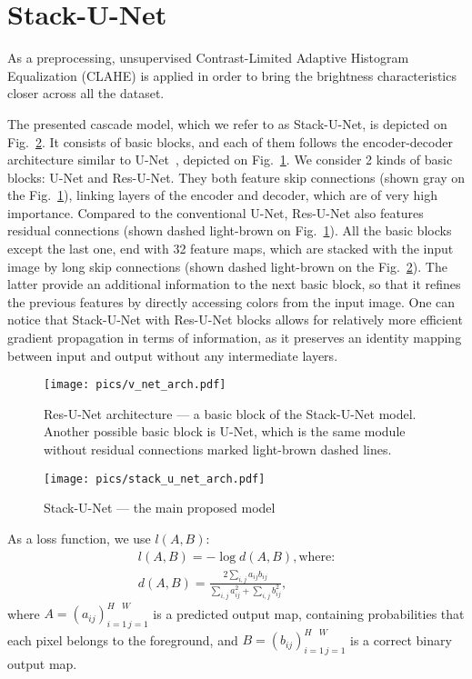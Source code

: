 \documentclass{llncs}
\begin{document}
\section{Stack-U-Net}

As a preprocessing, unsupervised Contrast-Limited Adaptive Histogram Equalization (CLAHE) \cite{szeliski2010computer} is applied in order to bring the brightness characteristics closer across all the dataset. 

The presented cascade model, which we refer to as Stack-U-Net, is depicted on Fig.~\ref{fig:stack-u-net}. It consists of basic blocks, and each of them follows the encoder-decoder architecture similar to U-Net~\cite{ronneberger2015u}, depicted on Fig.~\ref{fig:basic_block}. We consider 2 kinds of basic blocks: U-Net and Res-U-Net. They both feature skip connections (shown gray on the Fig.~\ref{fig:basic_block}), linking layers of the encoder and decoder, which are of very high importance. Compared to the conventional U-Net, Res-U-Net also features residual connections (shown dashed light-brown on Fig.~\ref{fig:basic_block}). All the basic blocks except the last one, end with 32 feature maps, which are stacked with the input image by long skip connections (shown dashed light-brown on the Fig.~\ref{fig:stack-u-net}). The latter provide an additional information to the next basic block, so that it refines the previous features by directly accessing colors from the input image.  One can notice that Stack-U-Net with Res-U-Net blocks allows for relatively more efficient gradient propagation in terms of information, as it preserves an identity mapping \cite{he2016identity,lin2017refinenet} between input and output without any intermediate layers. 

\begin{figure}[ht!]
	\centering
    \texttt{[image: pics/v\_net\_arch.pdf]}
    \caption{Res-U-Net architecture --- a basic block of the Stack-U-Net model. Another possible basic block is U-Net, which is the same module without residual connections marked light-brown dashed lines.}
    \label{fig:basic_block}
\end{figure}

\begin{figure}[ht!]
	\centering
    \texttt{[image: pics/stack\_u\_net\_arch.pdf]}
    \caption{Stack-U-Net --- the main proposed model}
    \label{fig:stack-u-net}
\end{figure}
  As a loss function, we use $l(A, B)$:
	\begin{gather*}
	l(A, B) = -\log d(A, B), \text{where:}\\
	d(A, B) = \frac{2\sum\limits_{i, j} a_{ij} b_{ij}}
	{\sum\limits_{i, j} a_{ij}^2 + \sum\limits_{i, j} b_{ij}^2},
	\end{gather*}
	where $A = (a_{ij})_{i=1\, j=1}^{H\;\;\;W}$ is a predicted output map, containing probabilities that each pixel belongs to the foreground, and $B = (b_{ij})_{i=1\, j=1}^{H\;\;\;W}$ is a correct binary output map. 
	
\end{document}

